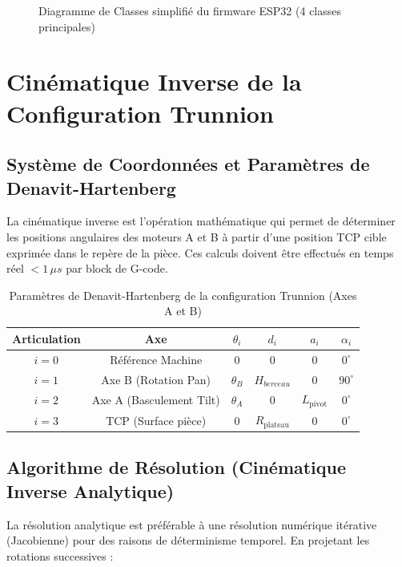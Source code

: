 \begin{figure}[htbp]
{
    }
    \caption{Diagramme de Classes simplifié du firmware ESP32 (4 classes principales)}
    \label{fig:uml_classes_fw}
\end{figure}

\section{Cinématique Inverse de la Configuration Trunnion}

\subsection{Système de Coordonnées et Paramètres de Denavit-Hartenberg}
La cinématique inverse est l'opération mathématique qui permet de déterminer les positions angulaires des moteurs A et B à partir d'une position TCP cible exprimée dans le repère de la pièce. Ces calculs doivent être effectués en temps réel $< 1\,\mu s$ par block de G-code.

\begin{table}[htbp]
\centering
\renewcommand{\arraystretch}{1.3}
\begin{tabular}{|c|c|c|c|c|c|}
\hline
\rowcolor{macouleur!20}
\textbf{Articulation} & \textbf{Axe} & $\theta_i$ & $d_i$ & $a_i$ & $\alpha_i$ \\
\hline
$i = 0$ & Référence Machine & $0$ & $0$ & $0$ & $0^\circ$ \\
\hline
$i = 1$ & Axe B (Rotation Pan) & $\theta_B$ & $H_{berceau}$ & $0$ & $90^\circ$ \\
\hline
$i = 2$ & Axe A (Basculement Tilt) & $\theta_A$ & $0$ & $L_{\text{pivot}}$ & $0^\circ$ \\
\hline
$i = 3$ & TCP (Surface pièce) & $0$ & $R_{\text{plateau}}$ & $0$ & $0^\circ$ \\
\hline
\end{tabular}
\caption{Paramètres de Denavit-Hartenberg de la configuration Trunnion (Axes A et B)}
\label{tab:dh_params}
\end{table}

\subsection{Algorithme de Résolution (Cinématique Inverse Analytique)}
La résolution analytique est préférable à une résolution numérique itérative (Jacobienne) pour des raisons de déterminisme temporel. En projetant les rotations successives :

